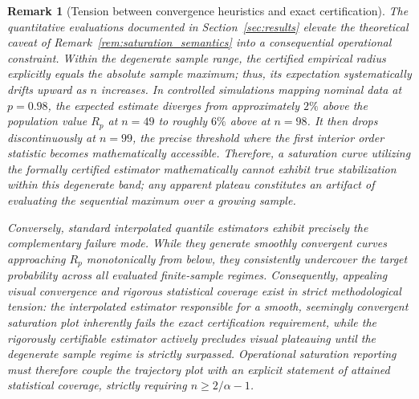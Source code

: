 \documentclass[a4paper]{cas-sc}
\newtheorem{remark}{Remark}
\begin{document}
\begin{remark}[Tension between convergence heuristics and exact certification]
\label{rem:saturation_tension}
The quantitative evaluations documented in Section~\ref{sec:results} elevate the theoretical caveat of Remark~\ref{rem:saturation_semantics} into a consequential operational constraint. Within the degenerate sample range, the certified empirical radius explicitly equals the absolute sample maximum; thus, its expectation systematically drifts upward as \(n\) increases. In controlled simulations mapping nominal data at \(p=0.98\), the expected estimate diverges from approximately \(2\%\) above the population value \(R_p\) at \(n=49\) to roughly \(6\%\) above at \(n=98\). It then drops discontinuously at \(n=99\), the precise threshold where the first interior order statistic becomes mathematically accessible. Therefore, a saturation curve utilizing the formally certified estimator mathematically \emph{cannot} exhibit true stabilization within this degenerate band; any apparent plateau constitutes an artifact of evaluating the sequential maximum over a growing sample.

Conversely, standard interpolated quantile estimators exhibit precisely the complementary failure mode. While they generate smoothly convergent curves approaching \(R_p\) monotonically from below, they consistently undercover the target probability across all evaluated finite-sample regimes. Consequently, appealing visual convergence and rigorous statistical coverage exist in strict methodological tension: the interpolated estimator responsible for a smooth, seemingly convergent saturation plot inherently fails the exact certification requirement, while the rigorously certifiable estimator actively precludes visual plateauing until the degenerate sample regime is strictly surpassed. Operational saturation reporting must therefore couple the trajectory plot with an explicit statement of attained statistical coverage, strictly requiring \(n\ge 2/\alpha-1\).
\end{remark}
\end{document}
